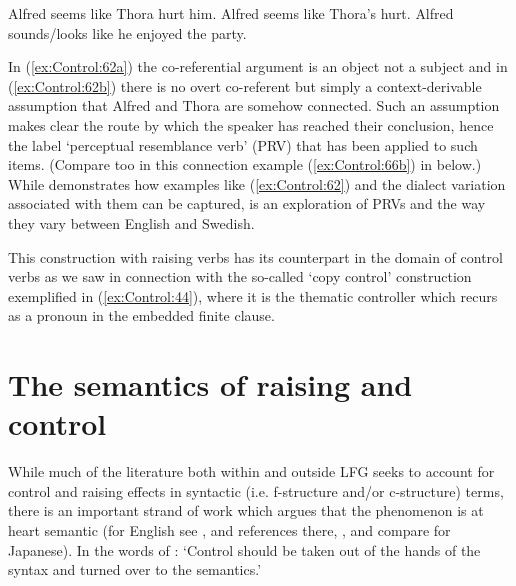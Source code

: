 \documentclass[output=paper,hidelinks]{langscibook}
\begin{document}
\ea\label{ex:Control:62}
\ea\label{ex:Control:62a} Alfred seems like Thora hurt him.
\ex\label{ex:Control:62b} Alfred seems like Thora's hurt.
\ex\label{ex:Control:62c} Alfred sounds/looks like he enjoyed the party.
\z\z

\noindent
In (\ref{ex:Control:62a}) the co-referential argument is an object not a subject and in (\ref{ex:Control:62b}) there is no overt co-referent but simply a context-derivable assumption that Alfred and Thora are somehow connected. Such an assumption makes clear the route by which the speaker has reached their conclusion, hence the label `perceptual resemblance verb' (PRV) that has been applied to such items. (Compare too in this connection example (\ref{ex:Control:66b}) in  below.) While \citet[351--356]{Asudeh12} demonstrates how examples like (\ref{ex:Control:62}) and the dialect variation associated with them can be captured, \citet{Toivonen2021} is an exploration of PRVs and the way they vary between English and Swedish.

This construction with raising verbs has its counterpart in the domain of control verbs as we saw in connection with the so-called `copy control' construction exemplified in (\ref{ex:Control:44}), where it is the thematic controller which recurs as a pronoun in the embedded finite clause.

\section{The semantics of raising and control}
\label{sec:Control:10}

While much of the literature both within and outside LFG seeks to account for control and raising effects in syntactic (i.e. f-structure and/or c-structure) terms, there is an important strand of work which argues that the phenomenon is at heart semantic (for English see \citealt{JackendoffCulicover2003}, \citealt{CulicoverJackendoff2006} and references there, \citealt{Duffley2014}, and compare \citealt{AkuzawaKubota2020} for Japanese). In the words of \citet[152]{CulicoverJackendoff2006}: `Control should be taken out of the hands of the syntax and turned over to the semantics.'
\end{document}
